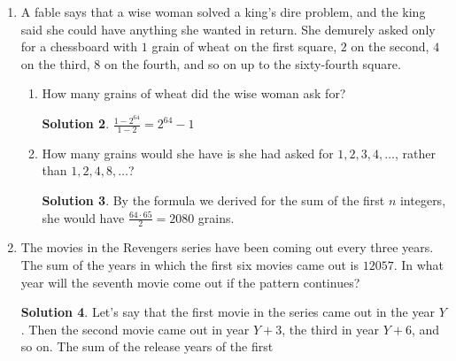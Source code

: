 \documentclass{article}
\theoremstyle{definition}
\newtheorem*{solution}{Solution}
\begin{document}
\begin{enumerate}
\begin{solution}
            traveled $20\left(\frac{2}{3}\right)$ between the first and the
            second bounce. The maximum height after the second bounce is
            $10\left(\frac{2}{3}\right)^2$ meters, so the ball traveled
            $20\left(\frac{2}{3}\right)^2$ meters between the second and third
            bounce. Notice that we have an infinite geometric series here, with
            first term $20\left(\frac{2}{3}\right) = \frac{40}{3}$ and common
            ratio $\frac{2}{3}$. Its sum is $\frac{\frac{40}{3}}{1 -
            \frac{2}{3}} = 40$. Adding the initial $10$ meter fall, we see that
            the ball will travel a total of $40 + 10 = 50$ meters.
        \end{solution}
        \item A fable says that a wise woman solved a king's dire problem, and
        the king said she could have anything she wanted in return. She demurely
        asked only for a chessboard with $1$ grain of wheat on the first square,
        $2$ on the second, $4$ on the third, $8$ on the fourth, and so on up to
        the sixty-fourth square.
        \begin{enumerate}
            \item How many grains of wheat did the wise woman ask for?
            \begin{solution}
                $\frac{1 - 2^{64}}{1 - 2} = 2^{64} - 1$
            \end{solution}
            \item How many grains would she have is she had asked for $1, 2, 3,
            4, \dots$, rather than $1, 2, 4, 8, \dots$?
            \begin{solution}
                By the formula we derived for the sum of the first $n$ integers,
                she would have $\frac{64 \cdot 65}{2} = 2080$ grains.
            \end{solution}
        \end{enumerate}
        \item The movies in the Revengers series have been coming out every
        three years. The sum of the years in which the first six movies came out
        is $12057$. In what year will the seventh movie come out if the pattern
        continues?
        \begin{solution}
            Let's say that the first movie in the series came out in the year
            $Y$. Then the second movie came out in year $Y + 3$, the third in
            year $Y + 6$, and so on. The sum of the release years of the first

\end{solution}
\end{enumerate}
\end{document}
